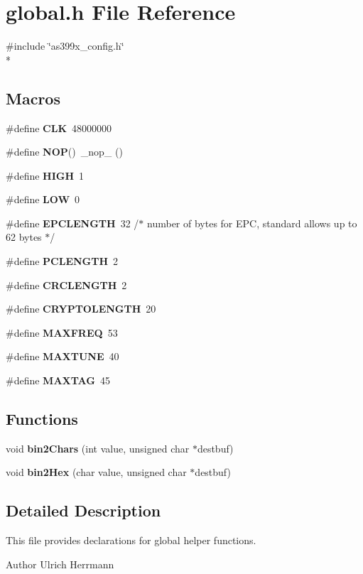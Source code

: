 \section{global.\-h File Reference}
\label{global_8h}
{\ttfamily \#include \char`\"{}as399x\-\_\-config.\-h\char`\"{}}\\*
\subsection*{Macros}
\begin{DoxyCompactItemize}
\item 
\#define {\bf C\-L\-K}~48000000
\item 
\#define {\bf N\-O\-P}()~\-\_\-nop\-\_\- ()
\item 
\#define {\bf H\-I\-G\-H}~1
\item 
\#define {\bf L\-O\-W}~0
\item 
\#define {\bf E\-P\-C\-L\-E\-N\-G\-T\-H}~32  /$\ast$ number of bytes for E\-P\-C, standard allows up to 62 bytes $\ast$/
\item 
\#define {\bf P\-C\-L\-E\-N\-G\-T\-H}~2
\item 
\#define {\bf C\-R\-C\-L\-E\-N\-G\-T\-H}~2
\item 
\#define {\bf C\-R\-Y\-P\-T\-O\-L\-E\-N\-G\-T\-H}~20
\item 
\#define {\bf M\-A\-X\-F\-R\-E\-Q}~53
\item 
\#define {\bf M\-A\-X\-T\-U\-N\-E}~40
\item 
\#define {\bf M\-A\-X\-T\-A\-G}~45
\end{DoxyCompactItemize}
\subsection*{Functions}
\begin{DoxyCompactItemize}
\item 
void {\bf bin2\-Chars} (int value, unsigned char $\ast$destbuf)
\item 
void {\bf bin2\-Hex} (char value, unsigned char $\ast$destbuf)
\end{DoxyCompactItemize}


\subsection{Detailed Description}
This file provides declarations for global helper functions. \begin{DoxyAuthor}{Author}
Ulrich Herrmann 
\end{DoxyAuthor}


